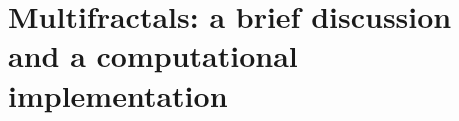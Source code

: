 
\chapter{Multifractals: a brief discussion and a computational implementation} %

\label{Chapter3} %



